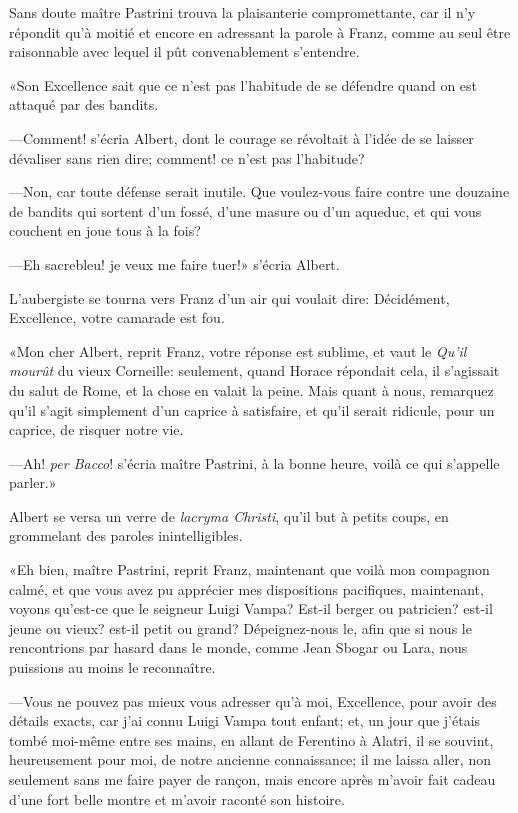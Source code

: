Sans doute maître Pastrini trouva la plaisanterie compromettante, car il n'y répondit qu'à moitié et encore en adressant la parole à Franz, comme au seul être raisonnable avec lequel il pût convenablement s'entendre. 

«Son Excellence sait que ce n'est pas l'habitude de se défendre quand on est attaqué par des bandits. 

—Comment! s'écria Albert, dont le courage se révoltait à l'idée de se laisser dévaliser sans rien dire; comment! ce n'est pas l'habitude? 

—Non, car toute défense serait inutile. Que voulez-vous faire contre une douzaine de bandits qui sortent d'un fossé, d'une masure ou d'un aqueduc, et qui vous couchent en joue tous à la fois? 

—Eh sacrebleu! je veux me faire tuer!» s'écria Albert. 

L'aubergiste se tourna vers Franz d'un air qui voulait dire: Décidément, Excellence, votre camarade est fou. 

«Mon cher Albert, reprit Franz, votre réponse est sublime, et vaut le \textit{Qu'il mourût} du vieux Corneille: seulement, quand Horace répondait cela, il s'agissait du salut de Rome, et la chose en valait la peine. Mais quant à nous, remarquez qu'il s'agit simplement d'un caprice à satisfaire, et qu'il serait ridicule, pour un caprice, de risquer notre vie. 

—Ah! \textit{per Bacco}! s'écria maître Pastrini, à la bonne heure, voilà ce qui s'appelle parler.» 

Albert se versa un verre de \textit{lacryma Christi}, qu'il but à petits coups, en grommelant des paroles inintelligibles. 

«Eh bien, maître Pastrini, reprit Franz, maintenant que voilà mon compagnon calmé, et que vous avez pu apprécier mes dispositions pacifiques, maintenant, voyons qu'est-ce que le seigneur Luigi Vampa? Est-il berger ou patricien? est-il jeune ou vieux? est-il petit ou grand? Dépeignez-nous le, afin que si nous le rencontrions par hasard dans le monde, comme Jean Sbogar ou Lara, nous puissions au moins le reconnaître. 

—Vous ne pouvez pas mieux vous adresser qu'à moi, Excellence, pour avoir des détails exacts, car j'ai connu Luigi Vampa tout enfant; et, un jour que j'étais tombé moi-même entre ses mains, en allant de Ferentino à Alatri, il se souvint, heureusement pour moi, de notre ancienne connaissance; il me laissa aller, non seulement sans me faire payer de rançon, mais encore après m'avoir fait cadeau d'une fort belle montre et m'avoir raconté son histoire. 

